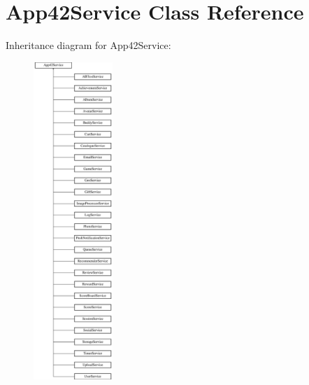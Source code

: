 \hypertarget{class_app42_service}{\section{App42\+Service Class Reference}
\label{class_app42_service}
}
Inheritance diagram for App42\+Service\+:\begin{figure}[H]
\begin{center}
\leavevmode
\includegraphics[height=12.000000cm]{class_app42_service}
\end{center}
\end{figure}
